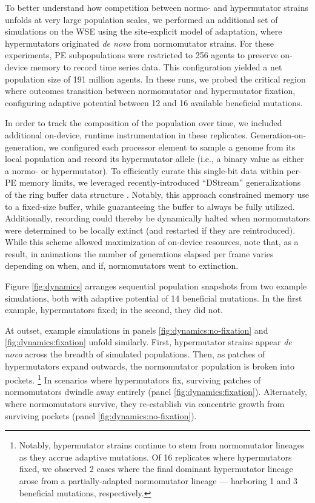 To better understand how competition between normo- and hypermutator strains unfolds at very large population scales, we performed an additional set of simulations on the WSE using the site-explicit model of adaptation, where hypermutators originated \textit{de novo} from normomutator strains.
For these experiments, PE subpopulations were restricted to 256 agents to preserve on-device memory to record time series data.
This configuration yielded a net population size of 191 million agents.
In these runs, we probed the critical region where outcomes transition between normomutator and hypermutator fixation, configuring adaptive potential between 12 and 16 available beneficial mutations.

In order to track the composition of the population over time, we included additional on-device, runtime instrumentation in these replicates.
Generation-on-generation, we configured each processor element to sample a genome from its local population and record its hypermutator allele (i.e., a binary value as either a normo- or hypermutator).
To efficiently curate this single-bit data within per-PE memory limits, we leveraged recently-introduced ``DStream'' generalizations of the ring buffer data structure \citep{moreno2024algorithms}.
Notably, this approach constrained memory use to a fixed-size buffer, while guaranteeing the buffer to always be fully utilized.
Additionally, recording could thereby be dynamically halted when normomutators were determined to be locally extinct (and restarted if they are reintroduced).
While this scheme allowed maximization of on-device resources, note that, as a result, in animations the number of generations elapsed per frame varies depending on when, and if, normomutators went to extinction.



Figure \ref{fig:dynamics} arranges sequential population snapshots from two example simulations, both with adaptive potential of 14 beneficial mutations.
In the first example, hypermutators fixed; in the second, they did not.

At outset, example simulations in panels \ref{fig:dynamics:no-fixation} and \ref{fig:dynamics:fixation} unfold similarly.
First, hypermutator strains appear \textit{de novo} across the breadth of simulated populations.
Then, as patches of hypermutators expand outwards, the normomutator population is broken into pockets.%
\footnote{%
Notably, hypermutator strains continue to stem from normomutator lineages as they accrue adaptive mutations.
Of 16 replicates where hypermutators fixed, we observed 2 cases where the final dominant hypermutator lineage arose from a partially-adapted normomutator lineage --- harboring 1 and 3 beneficial mutations, respectively.
}
In scenarios where hypermutators fix, surviving patches of normomutators dwindle away entirely (panel \ref{fig:dynamics:fixation}).
Alternately, where normomutators survive, they re-establish via concentric growth from surviving pockets (panel \ref{fig:dynamics:no-fixation}).

